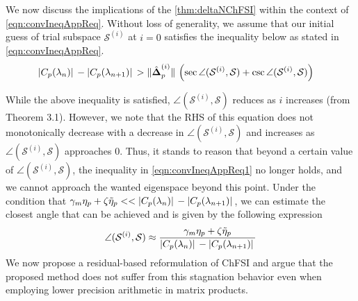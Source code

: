 \documentclass[preprint,3p,number,sort&compress]{elsarticle}
\newcommand{\bDelta}{\boldsymbol{\Delta}}
\DeclarePairedDelimiter\norm{\lVert}{\rVert\,}%
\DeclarePairedDelimiter\abs{\lvert}{\rvert\,}%
\begin{document}
We now discuss the implications of the \cref{thm:deltaNChFSI} within the context of \cref{eqn:convIneqAppReq}. Without loss of generality, we assume that our initial guess of trial subspace $\mathcal{S}^{(i)}$ at $i=0$ satisfies the inequality below as stated in \cref{eqn:convIneqAppReq}.
\begin{align}
 \abs{C_p(\lambda_n)}-\abs{C_p(\lambda_{n+1})}&>\norm{\hat{\bDelta}_p^{(i)}}\left(\sec{\angle(\mathcal{S}^{(i)},\mathcal{S})}+\csc{\angle(\mathcal{S}^{(i)},\mathcal{S})}\right) \label{eqn:convIneqAppReq1}
\end{align}

While the above inequality is satisfied, $\angle(\mathcal{S}^{(i)},\mathcal{S})$ reduces as $i$ increases (from Theorem 3.1). However, we note that the RHS of this equation does not monotonically decrease with a decrease in $\angle(\mathcal{S}^{(i)},\mathcal{S})$ and increases as $\angle(\mathcal{S}^{(i)},\mathcal{S})$ approaches 0. Thus, it stands to reason that beyond a certain value of $\angle(\mathcal{S}^{(i)},\mathcal{S})$, the inequality in \cref{eqn:convIneqAppReq1} no longer holds, and we cannot approach the wanted eigenspace beyond this point. Under the condition that $\gamma_m\eta_{p}+\zeta\tilde{\eta}_p<<\abs{C_p(\lambda_n)}-\abs{C_p(\lambda_{n+1})}$, we can estimate the closest angle that can be achieved and is given by the following expression
\begin{align}
\angle(\mathcal{S}^{(i)},\mathcal{S})\approx\frac{\gamma_m\eta_{p}+\zeta\tilde{\eta}_p}{\abs{C_p(\lambda_n)}-\abs{C_p(\lambda_{n+1})}}
\end{align}
We now propose a residual-based reformulation of ChFSI and argue that the proposed method does not suffer from this stagnation behavior even when employing lower precision arithmetic in matrix products.
\end{document}
